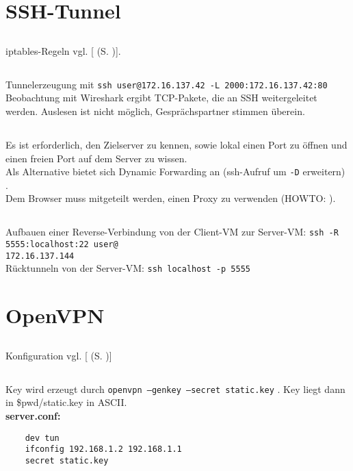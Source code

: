 \documentclass[twoside]{article}
\newcommand{\ttt}[1]{%
	\texttt{#1}%
}
\newcommand{\mref}[1]{[\nameref{#1} (S. \pageref{#1})]}
\begin{document}
\section{SSH-Tunnel}
\label{sec:ssh-tunnel}
	\subsection{}
	\label{ssec:4.1}
	iptables-Regeln vgl. \mref{a4-1}.
	\subsection{}
	\label{ssec:4.2}
	Tunnelerzeugung mit \ttt{ssh user@172.16.137.42 -L 2000:172.16.137.42:80}\\
	Beobachtung mit Wireshark ergibt TCP-Pakete, die an SSH weitergeleitet werden.
	Auslesen ist nicht möglich, Gesprächspartner stimmen überein.
	\subsection{}
	\label{ssec:4.3}
	Es ist erforderlich, den Zielserver zu kennen, sowie lokal einen Port zu öffnen und einen freien Port auf dem Server zu wissen.\\
	Als Alternative bietet sich Dynamic Forwarding an (ssh-Aufruf um \ttt{-D} erweitern) \cite{ubuntu:ssh}.\\
	Dem Browser muss mitgeteilt werden, einen Proxy zu verwenden (HOWTO: \cite{ubuntu:sshdyn}).
	\subsection{}
	\label{ssec:4.4}
	Aufbauen einer Reverse-Verbindung von der Client-VM zur Server-VM: \ttt{ssh -R 5555:localhost:22 user@}\\\ttt{172.16.137.144}\\
	Rücktunneln von der Server-VM: \ttt{ssh localhost -p 5555} \cite{reverse-ssh}
	
\section{OpenVPN}
\label{sec:openvpn}
	\subsection{}
	\label{ssec:5.1}
	Konfiguration vgl. \mref{a5-1}
	\subsection{}
	\label{ssec:5.2}
	Key wird erzeugt durch \ttt{openvpn --genkey --secret static.key}.
	Key liegt dann in \$pwd/static.key in ASCII.\\
	\textbf{server.conf:}
	\begin{verbatim}
	dev tun
	ifconfig 192.168.1.2 192.168.1.1
	secret static.key
	\end{verbatim}
\end{document}
